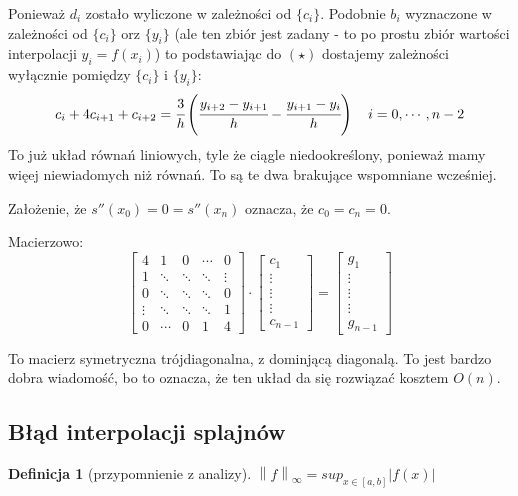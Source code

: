 \documentclass[hidelinks,a4paper,fleqn,oneside]{book}
\newcommand{\norm}[1]{\left\lVert#1\right\rVert}
\newtheorem{defi}{Definicja}
\begin{document}
Ponieważ $d_i$ zostało wyliczone w zależności od $\{c_i\}$. Podobnie $b_i$ wyznaczone w zależności od $\{c_i\}$ orz $\{y_i\}$ (ale ten zbiór jest zadany - to po prostu zbiór wartości interpolacji $y_i = f(x_i)$) to podstawiając do $(\star)$ dostajemy zależności wyłącznie pomiędzy $\{c_i\}$ i $\{y_i\}$:
\[
	c_i + 4c_{i+1} + c_{i+2} = \cfrac{3}{h}\left(\cfrac{y_{i+2} - y_{i+1}}{h} - \cfrac{y_{i+1} - y_i}{h}\right) \quad i = 0, \cdots, n-2
\]
To już układ równań liniowych, tyle że ciągle niedookreślony, ponieważ mamy więej niewiadomych niż równań. To są te dwa brakujące wspomniane wcześniej. 

Założenie, że $s''(x_0) = 0 = s''(x_n)$ oznacza, że $c_0 = c_n = 0$.

Macierzowo:
\[
	\left[
		\begin{array}{ccccc}
		4 & 1 & 0 & \cdots & 0 \\ \hline
		1 & \ddots & \ddots & \ddots & \vdots \\
		0 & \ddots & \ddots & \ddots & 0 \\
		\vdots & \ddots & \ddots & \ddots & 1 \\  \hline
		0 & \cdots & 0 & 1 & 4
		\end{array}
	\right]
	\cdot 
	\left[
		\begin{array}{c}
		c_1 \\
		\vdots \\
		\vdots \\
		\vdots \\
		c_{n-1}
		\end{array}
	\right]	
	=
	\left[
		\begin{array}{c}
		g_1 \\
		\vdots \\
		\vdots \\
		\vdots \\
		g_{n-1}
		\end{array}
	\right]	
\]

To macierz symetryczna trójdiagonalna, z dominjącą diagonalą. To jest bardzo dobra wiadomość, bo to oznacza, że ten układ da się rozwiązać kosztem $O(n)$.

\subsection{Błąd interpolacji splajnów} 

\begin{defi}[przypomnienie z analizy]
	$\norm{f}_\infty = sup_{x \in [a, b]}|f(x)|$
\end{defi}
\end{document}
